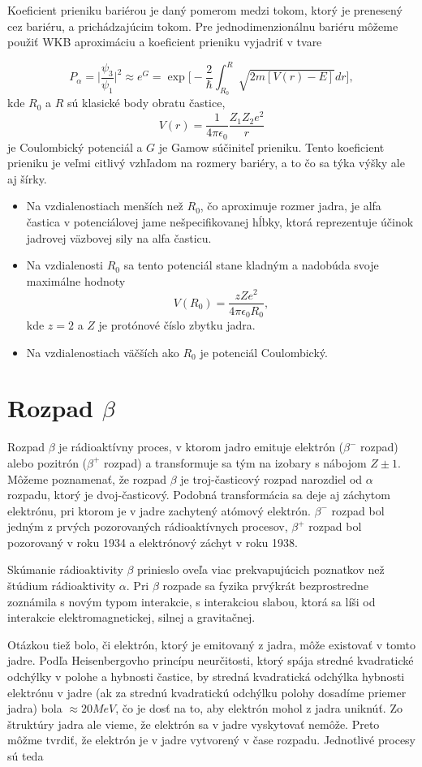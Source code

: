 \documentclass[../../main.tex]{subfiles}
\begin{document}
Koeficient prieniku bariérou je daný pomerom medzi tokom, ktorý je prenesený cez bariéru, a prichádzajúcim tokom. Pre jednodimenzionálnu bariéru môžeme použiť WKB aproximáciu a koeficient prieniku vyjadriť v tvare

$$ P_{\alpha} = \bigg\vert \frac{\psi_3}{\psi_1} \bigg\vert^2 \approx e^G = \exp \bigg[ -\frac{2}{\hbar} \int_{R_0}^R \sqrt{2m[V(r)-E]}dr  \bigg],$$
kde $R_0$ a $R$ sú klasické body obratu častice,
$$ V(r)=\frac{1}{4\pi \epsilon_0} \frac{Z_1 Z_2 e^2}{r} $$
je Coulombický potenciál a $G$ je Gamow súčiniteľ prieniku. Tento koeficient prieniku je veľmi citlivý vzhľadom na rozmery bariéry, a to čo sa týka výšky ale aj šírky. 

\begin{itemize}
\item Na vzdialenostiach menších než $R_0$, čo aproximuje rozmer jadra, je alfa častica v potenciálovej jame nešpecifikovanej hĺbky, ktorá reprezentuje účinok jadrovej väzbovej sily na alfa časticu. 
\item Na vzdialenosti $R_0$ sa tento potenciál stane kladným a nadobúda svoje maximálne hodnoty
$$ V(R_0) = \frac{zZe^2}{4\pi \epsilon_0 R_0}, $$ 
kde $z=2$ a $Z$ je protónové číslo zbytku jadra. 
\item Na vzdialenostiach väčších ako $R_0$ je potenciál Coulombický.
\end{itemize}

\section{Rozpad $\beta$}
Rozpad $\beta$ je rádioaktívny proces, v ktorom jadro emituje elektrón ($\beta^-$ rozpad) alebo pozitrón ($\beta^+$ rozpad) a transformuje sa tým na izobary s nábojom $Z\pm1$. Môžeme poznamenať, že rozpad $\beta$ je troj-časticový rozpad narozdiel od $\alpha$ rozpadu, ktorý je dvoj-časticový.
Podobná transformácia sa deje aj záchytom elektrónu, pri ktorom je v jadre zachytený atómový elektrón. $\beta^-$ rozpad bol jedným z prvých pozorovaných rádioaktívnych procesov, $\beta^+$ rozpad bol pozorovaný v roku 1934 a elektrónový záchyt v roku 1938.

Skúmanie rádioaktivity $\beta$ prinieslo oveľa viac prekvapujúcich poznatkov než štúdium rádioaktivity $\alpha$. Pri $\beta$ rozpade sa fyzika prvýkrát bezprostredne zoznámila s novým typom interakcie, s interakciou slabou, ktorá sa líši od interakcie elektromagnetickej, silnej a gravitačnej.

Otázkou tiež bolo, či elektrón, ktorý je emitovaný z jadra, môže existovať v tomto jadre. Podľa Heisenbergovho princípu neurčitosti, ktorý spája stredné kvadratické odchýlky v polohe a hybnosti častice, by stredná kvadratická odchýlka hybnosti elektrónu v jadre (ak za strednú kvadratickú odchýlku polohy dosadíme priemer jadra) bola $\approx 20 MeV$, čo je dosť na to, aby elektrón mohol z jadra uniknúť. Zo štruktúry jadra ale vieme, že elektrón sa v jadre vyskytovať nemôže. Preto môžme tvrdiť, že elektrón je v jadre vytvorený v čase rozpadu. Jednotlivé procesy sú teda
\end{document}
